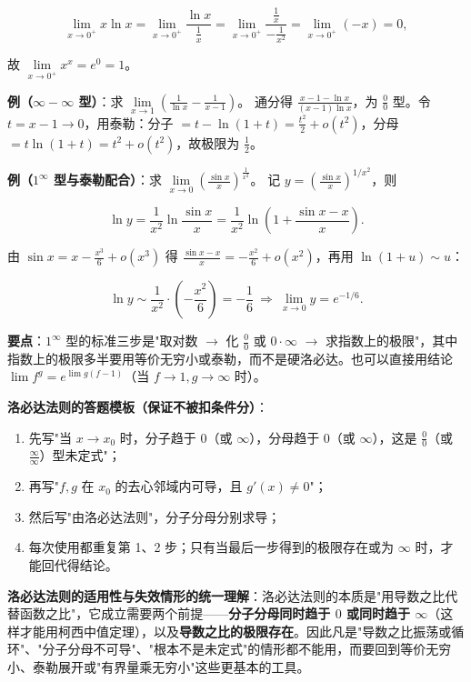 \documentclass[11pt,openany,UTF8]{ctexbook}
\begin{document}
\[\lim_{x\to0^+}x\ln x=\lim_{x\to0^+}\frac{\ln x}{\frac1x}
=\lim_{x\to0^+}\frac{\frac1x}{-\frac{1}{x^2}}
=\lim_{x\to0^+}(-x)=0,\]

故 $\lim\limits_{x\to0^+}x^x=e^0=1$。

\textbf{例（$\infty-\infty$ 型）}：求 $\lim\limits_{x\to1}\left(\frac{1}{\ln x}-\frac{1}{x-1}\right)$。 通分得 $\frac{x-1-\ln x}{(x-1)\ln x}$，为 $\frac00$ 型。令 $t=x-1\to0$，用泰勒：分子 $=t-\ln(1+t)=\frac{t^2}{2}+o(t^2)$，分母 $=t\ln(1+t)=t^2+o(t^2)$，故极限为 $\frac12$。

\textbf{例（$1^\infty$ 型与泰勒配合）}：求 $\lim\limits_{x\to0}\left(\frac{\sin x}{x}\right)^{\frac{1}{x^2}}$。 记 $y=\left(\frac{\sin x}{x}\right)^{1/x^2}$，则

\[\ln y=\frac{1}{x^2}\ln\frac{\sin x}{x}=\frac{1}{x^2}\ln\!\left(1+\frac{\sin x-x}{x}\right).\]

由 $\sin x=x-\frac{x^3}{6}+o(x^3)$ 得 $\frac{\sin x-x}{x}=-\frac{x^2}{6}+o(x^2)$，再用 $\ln(1+u)\sim u$：

\[\ln y\sim\frac{1}{x^2}\cdot\left(-\frac{x^2}{6}\right)=-\frac16\ \Longrightarrow\ \lim_{x\to0}y=e^{-1/6}.\]

\textbf{要点}：$1^\infty$ 型的标准三步是"取对数 $\to$ 化 $\frac00$ 或 $0\cdot\infty$ $\to$ 求指数上的极限"，其中指数上的极限多半要用等价无穷小或泰勒，而不是硬洛必达。也可以直接用结论 $\lim f^{g}=e^{\lim g(f-1)}$（当 $f\to1,g\to\infty$ 时）。

\textbf{洛必达法则的答题模板（保证不被扣条件分）}：

\begin{enumerate}
\item 先写"当 $x\to x_0$ 时，分子趋于 $0$（或 $\infty$），分母趋于 $0$（或 $\infty$），这是 $\frac00$（或 $\frac{\infty}{\infty}$）型未定式"；
\item 再写"$f,g$ 在 $x_0$ 的去心邻域内可导，且 $g'(x)\ne0$"；
\item 然后写"由洛必达法则"，分子分母分别求导；
\item 每次使用都重复第 1、2 步；只有当最后一步得到的极限存在或为 $\infty$ 时，才能回代得结论。
\end{enumerate}
\textbf{洛必达法则的适用性与失效情形的统一理解}：洛必达法则的本质是"用导数之比代替函数之比"，它成立需要两个前提——\textbf{分子分母同时趋于 $0$ 或同时趋于 $\infty$}（这样才能用柯西中值定理），以及\textbf{导数之比的极限存在}。因此凡是"导数之比振荡或循环"、"分子分母不可导"、"根本不是未定式"的情形都不能用，而要回到等价无穷小、泰勒展开或"有界量乘无穷小"这些更基本的工具。
\end{document}
